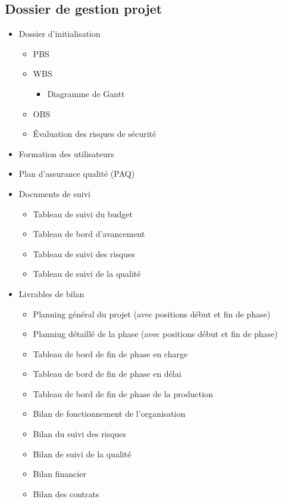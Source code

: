 \documentclass[a4paper]{article}
\begin{document}
	    \subsection{Dossier de gestion projet}
	    \begin{itemize}
	        \item Dossier d'initialisation
                \begin{itemize}
                    \item PBS
                    \item WBS
                        \begin{itemize}
                            \item Diagramme de Gantt
                            
                        \end{itemize}
                    \item OBS
                    \item Évaluation des risques de sécurité
                \end{itemize}
            \item Formation des utilisateurs
            \item Plan d'assurance qualité (PAQ)
            \item Documents de suivi
                \begin{itemize}
                    \item Tableau de suivi du budget
                    \item Tableau de bord d'avancement
                    \item Tableau de suivi des risques
                    \item Tableau de suivi de la qualité
                \end{itemize}
            \item Livrables de bilan
                \begin{itemize}
                    \item Planning général du projet (avec positions début et fin de phase)
                    \item Planning détaillé de la phase (avec positions début et fin de phase)
                    \item Tableau de bord de fin de phase en charge
                    \item Tableau de bord de fin de phase en délai
                    \item Tableau de bord de fin de phase de la production
                    \item Bilan de fonctionnement de l'organisation
                    \item Bilan du suivi des risques
                    \item Bilan de suivi de la qualité
                    \item Bilan financier
                    \item Bilan des contrats
                \end{itemize}
	    \end{itemize}
	    \hypertarget{logiciel}{}
\end{document}
